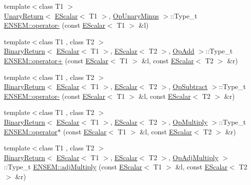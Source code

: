 \begin{DoxyCompactItemize}
\item 
{\footnotesize template$<$class T1 $>$ }\\\mbox{\hyperlink{structENSEM_1_1UnaryReturn}{Unary\+Return}}$<$ \mbox{\hyperlink{classENSEM_1_1EScalar}{E\+Scalar}}$<$ T1 $>$, \mbox{\hyperlink{structENSEM_1_1OpUnaryMinus}{Op\+Unary\+Minus}} $>$\+::Type\+\_\+t \mbox{\hyperlink{group__escalar_ga19df0fab753be25388f62c774ecdffae}{E\+N\+S\+E\+M\+::operator-\/}} (const \mbox{\hyperlink{classENSEM_1_1EScalar}{E\+Scalar}}$<$ T1 $>$ \&l)
\item 
{\footnotesize template$<$class T1 , class T2 $>$ }\\\mbox{\hyperlink{structENSEM_1_1BinaryReturn}{Binary\+Return}}$<$ \mbox{\hyperlink{classENSEM_1_1EScalar}{E\+Scalar}}$<$ T1 $>$, \mbox{\hyperlink{classENSEM_1_1EScalar}{E\+Scalar}}$<$ T2 $>$, \mbox{\hyperlink{structENSEM_1_1OpAdd}{Op\+Add}} $>$\+::Type\+\_\+t \mbox{\hyperlink{group__escalar_gacf8bfdceca4578af5c8007fe00b2bf8e}{E\+N\+S\+E\+M\+::operator+}} (const \mbox{\hyperlink{classENSEM_1_1EScalar}{E\+Scalar}}$<$ T1 $>$ \&l, const \mbox{\hyperlink{classENSEM_1_1EScalar}{E\+Scalar}}$<$ T2 $>$ \&r)
\item 
{\footnotesize template$<$class T1 , class T2 $>$ }\\\mbox{\hyperlink{structENSEM_1_1BinaryReturn}{Binary\+Return}}$<$ \mbox{\hyperlink{classENSEM_1_1EScalar}{E\+Scalar}}$<$ T1 $>$, \mbox{\hyperlink{classENSEM_1_1EScalar}{E\+Scalar}}$<$ T2 $>$, \mbox{\hyperlink{structENSEM_1_1OpSubtract}{Op\+Subtract}} $>$\+::Type\+\_\+t \mbox{\hyperlink{group__escalar_gaab8719cf0db585f9ffd1685fff3e96d4}{E\+N\+S\+E\+M\+::operator-\/}} (const \mbox{\hyperlink{classENSEM_1_1EScalar}{E\+Scalar}}$<$ T1 $>$ \&l, const \mbox{\hyperlink{classENSEM_1_1EScalar}{E\+Scalar}}$<$ T2 $>$ \&r)
\item 
{\footnotesize template$<$class T1 , class T2 $>$ }\\\mbox{\hyperlink{structENSEM_1_1BinaryReturn}{Binary\+Return}}$<$ \mbox{\hyperlink{classENSEM_1_1EScalar}{E\+Scalar}}$<$ T1 $>$, \mbox{\hyperlink{classENSEM_1_1EScalar}{E\+Scalar}}$<$ T2 $>$, \mbox{\hyperlink{structENSEM_1_1OpMultiply}{Op\+Multiply}} $>$\+::Type\+\_\+t \mbox{\hyperlink{group__escalar_ga87a689c2f74aa616bca6523845562c12}{E\+N\+S\+E\+M\+::operator$\ast$}} (const \mbox{\hyperlink{classENSEM_1_1EScalar}{E\+Scalar}}$<$ T1 $>$ \&l, const \mbox{\hyperlink{classENSEM_1_1EScalar}{E\+Scalar}}$<$ T2 $>$ \&r)
\item 
{\footnotesize template$<$class T1 , class T2 $>$ }\\\mbox{\hyperlink{structENSEM_1_1BinaryReturn}{Binary\+Return}}$<$ \mbox{\hyperlink{classENSEM_1_1EScalar}{E\+Scalar}}$<$ T1 $>$, \mbox{\hyperlink{classENSEM_1_1EScalar}{E\+Scalar}}$<$ T2 $>$, \mbox{\hyperlink{structENSEM_1_1OpAdjMultiply}{Op\+Adj\+Multiply}} $>$\+::Type\+\_\+t \mbox{\hyperlink{group__escalar_ga8cef36c4e2779c7d7dbf64b9500b053c}{E\+N\+S\+E\+M\+::adj\+Multiply}} (const \mbox{\hyperlink{classENSEM_1_1EScalar}{E\+Scalar}}$<$ T1 $>$ \&l, const \mbox{\hyperlink{classENSEM_1_1EScalar}{E\+Scalar}}$<$ T2 $>$ \&r)

\end{DoxyCompactItemize}
